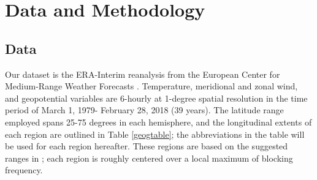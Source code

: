 \documentclass[smallextended]{svjour3}       %
\numberwithin{equation}{section}
\begin{document}
\section{Data and Methodology}
\label{dataandmet}

\subsection{Data}\label{datasec}


Our dataset is the ERA-Interim reanalysis from the European Center for Medium-Range Weather Forecasts \citep{dee_era-interim_2011}. Temperature, meridional and zonal wind, and geopotential variables are 6-hourly at 1-degree spatial resolution in the time period of March 1, 1979- February 28, 2018 (39 years). The latitude range employed spans 25-75 degrees in each hemisphere, and the longitudinal extents of each region are outlined in Table \ref{geogtable}; the abbreviations in the table will be used for each region hereafter. These regions are based on the suggested ranges in \cite{wiedenmann_climatology_2002}; each region is roughly centered over a local maximum of blocking frequency. 

\begin{table}
\caption{Longitudinal extents of study regions;  each region has a latitudinal extent of 25-75 degrees in their respective hemispheres. The regions can be seen outlined on the maps in Figures \ref{avg}-\ref{blockdens}. The two-letter abbreviations will be used to refer to these regions throughout the paper.}
\label{geogtable}
\end{table}
\end{document}
